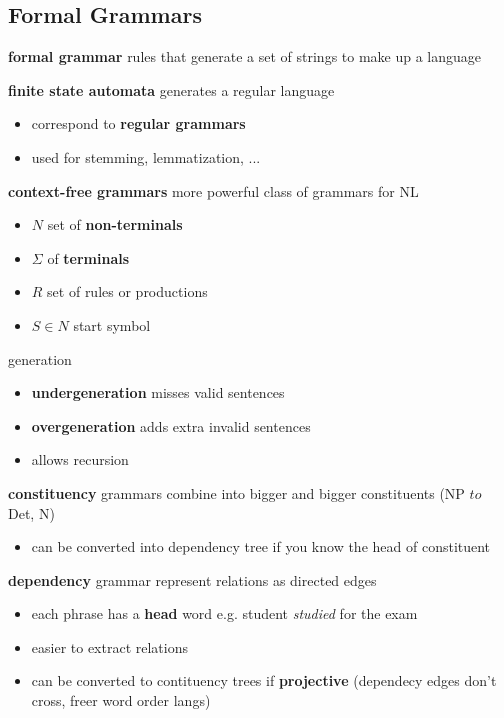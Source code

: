 \documentclass[]{article}
\theoremstyle{definition}
\begin{document}
\subsection{Formal Grammars}%
\label{sub:format_grammars}

\textbf{formal grammar} rules that generate a set of strings to make up a language

\textbf{finite state automata} generates a regular language
\begin{itemize}
    \item correspond to \textbf{regular grammars}
    \item used for stemming, lemmatization, ...
\end{itemize}

\textbf{context-free grammars} more powerful class of grammars for NL
\begin{itemize}
    \item $N$ set of \textbf{non-terminals}
    \item $\Sigma$ of \textbf{terminals}
    \item $R$ set of rules or productions
    \item $S \in N$ start symbol
\end{itemize}

generation
\begin{itemize}
    \item \textbf{undergeneration} misses valid sentences
    \item \textbf{overgeneration} adds extra invalid sentences
    \item allows recursion
\end{itemize}

\textbf{constituency} grammars combine into bigger and bigger constituents (NP $to$ Det, N)
\begin{itemize}
    \item can be converted into dependency tree if you know the head of constituent
\end{itemize}
\textbf{dependency} grammar represent relations as directed edges
\begin{itemize}
    \item each phrase has a \textbf{head} word e.g. student \textit{studied} for the exam
    \item easier to extract relations
    \item can be converted to contituency trees if \textbf{projective} (dependecy edges don't cross, freer word order langs)
\end{itemize}
\end{document}
